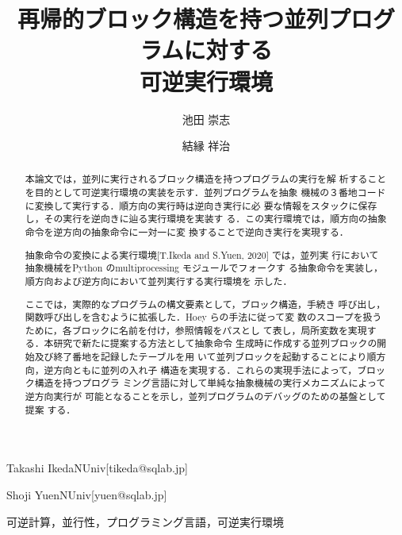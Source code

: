 \documentclass[submit,PRO]{ipsj}
\begin{document}
\title{再帰的ブロック構造を持つ並列プログラムに対する\\
      可逆実行環境}





\author{池田 崇志}{Takashi Ikeda}{NUniv}[tikeda@sqlab.jp]
\author{結縁 祥治}{Shoji Yuen}{NUniv}[yuen@sqlab.jp]


\begin{abstract}
本論文では，並列に実行されるブロック構造を持つプログラムの実行を解
析することを目的として可逆実行環境の実装を示す．並列プログラムを抽象
機械の３番地コードに変換して実行する．順方向の実行時は逆向き実行に必
要な情報をスタックに保存し，その実行を逆向きに辿る実行環境を実装す
る．この実行環境では，順方向の抽象命令を逆方向の抽象命令に一対一に変
換することで逆向き実行を実現する．

抽象命令の変換による実行環境[T.Ikeda and S.Yuen, 2020] では，並列実
行において抽象機械をPython のmultiprocessing モジュールでフォークす
る抽象命令を実装し，順方向および逆方向において並列実行する実行環境を
示した．

ここでは，実際的なプログラムの構文要素として，ブロック構造，手続き
呼び出し，関数呼び出しを含むように拡張した．Hoey らの手法に従って変
数のスコープを扱うために，各ブロックに名前を付け，参照情報をパスとし
て表し，局所変数を実現する．本研究で新たに提案する方法として抽象命令
生成時に作成する並列ブロックの開始及び終了番地を記録したテーブルを用
いて並列ブロックを起動することにより順方向，逆方向ともに並列の入れ子
構造を実現する．これらの実現手法によって，ブロック構造を持つプログラ
ミング言語に対して単純な抽象機械の実行メカニズムによって逆方向実行が
可能となることを示し，並列プログラムのデバッグのための基盤として提案
する．
\end{abstract}


\begin{jkeyword}
可逆計算，並行性，プログラミング言語，可逆実行環境
\end{jkeyword}
\end{document}
